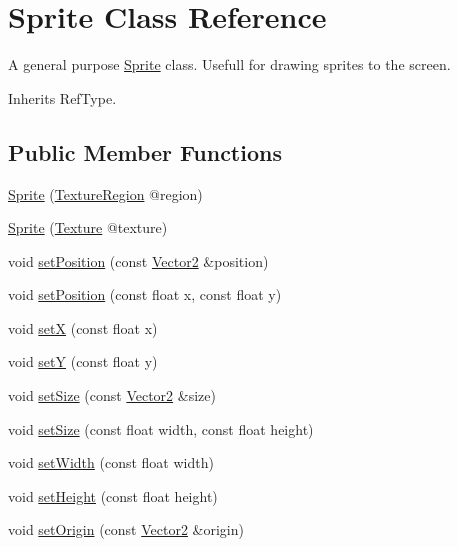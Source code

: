 \hypertarget{class_sprite}{\section{Sprite Class Reference}
\label{class_sprite}
}


A general purpose \hyperlink{class_sprite}{Sprite} class. Usefull for drawing sprites to the screen.  




Inherits Ref\+Type.

\subsection*{Public Member Functions}
\begin{DoxyCompactItemize}
\item 
\hyperlink{class_sprite_a29de4e0fc43c90ee54630f821fae3f6d}{Sprite} (\hyperlink{class_texture_region}{Texture\+Region} @region)
\item 
\hyperlink{class_sprite_a1b68b64346a1c99280740e825de21ec8}{Sprite} (\hyperlink{class_texture}{Texture} @texture)
\item 
void \hyperlink{class_sprite_a5c42a8a652adfd7a2185229dfa8a2f99}{set\+Position} (const \hyperlink{class_vector2}{Vector2} \&position)
\item 
void \hyperlink{class_sprite_a133841293df7a0780008d85e59b1df31}{set\+Position} (const float x, const float y)
\item 
void \hyperlink{class_sprite_a5bedef476f829d68dec5f67f9602e87a}{set\+X} (const float x)
\item 
void \hyperlink{class_sprite_a2d6ebc78c18b3208f0a8273fbc1850f5}{set\+Y} (const float y)
\item 
void \hyperlink{class_sprite_a33fe51395aa3d372a16ccda8df5c7b12}{set\+Size} (const \hyperlink{class_vector2}{Vector2} \&size)
\item 
void \hyperlink{class_sprite_aac25092845baff97e9bb62698826a0c0}{set\+Size} (const float width, const float height)
\item 
void \hyperlink{class_sprite_ad56841e9fb507722a51a5118cb44cf7f}{set\+Width} (const float width)
\item 
void \hyperlink{class_sprite_a5ecdfec7bba56cece063d846f4d43215}{set\+Height} (const float height)
\item 
void \hyperlink{class_sprite_a56199a8edb085342da44857635ec091a}{set\+Origin} (const \hyperlink{class_vector2}{Vector2} \&origin)
\item 

\end{DoxyCompactItemize}
